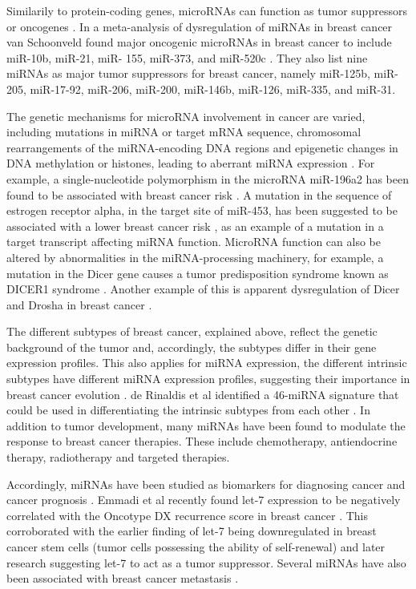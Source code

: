 Similarily to protein-coding genes, microRNAs can function as tumor
suppressors or oncogenes \citep{Lin2015}. In a meta-analysis of dysregulation
of miRNAs in breast cancer van Schoonveld found major oncogenic microRNAs in
breast cancer to include miR-10b, miR-21, miR- 155, miR-373, and miR-520c
\citep{vanSchooneveld2015}. They also list nine miRNAs as major tumor suppressors for breast cancer,
namely miR-125b, miR-205, miR-17-92, miR-206, miR-200, miR-146b, miR-126,
miR-335, and miR-31.

The genetic mechanisms for microRNA involvement in cancer are varied,
including mutations in miRNA or target mRNA sequence, chromosomal
rearrangements of the miRNA-encoding DNA regions and epigenetic changes in DNA
methylation or histones, leading to aberrant miRNA expression
\citep{Calin2006,Melo2011}. For example, a single-nucleotide polymorphism
in the microRNA miR-196a2 has been found to be associated with breast cancer
risk \citep{Gao2011}. A mutation in the sequence of estrogen receptor alpha,
in the target site of miR-453, has been suggested to be associated with a
lower breast cancer risk \citep{Tchatchou2009}, as an example of a mutation in
a target transcript affecting miRNA function. MicroRNA function can also be
altered by abnormalities in the miRNA-processing machinery, for example, a
mutation in the Dicer gene causes a tumor predisposition syndrome known as
DICER1 syndrome \citep{Slade2011}. Another example of this is apparent
dysregulation of Dicer and Drosha in breast cancer
\citep{Yan2012}.

The different subtypes of breast cancer, explained above, reflect the genetic
background of the tumor and, accordingly, the subtypes differ in their gene
expression profiles. This also applies for miRNA expression, the different
intrinsic subtypes have different miRNA expression profiles, suggesting their
importance in breast cancer evolution \citep{Blenkiron2007}. de Rinaldis et al
identified a 46-miRNA signature that could be used in differentiating the
intrinsic subtypes from each other \citep{deRinaldis2013}. In addition to
tumor development, many miRNAs have been found to modulate the response to
breast cancer therapies. These include chemotherapy, antiendocrine therapy,
radiotherapy and targeted therapies.

Accordingly, miRNAs have been studied as biomarkers for diagnosing cancer and
cancer prognosis \citep{}. Emmadi et al recently found let-7 expression to be negatively
correlated with the Oncotype DX recurrence score in breast cancer
\citep{Emmadi2015}. This corroborated with the earlier finding of let-7 being
downregulated in breast cancer stem cells (tumor cells possessing the ability
of self-renewal) \citep{Yu2007} and later research suggesting let-7 to act as
a tumor suppressor. Several miRNAs have also been associated with breast cancer
metastasis \citep{Chen2016}.

